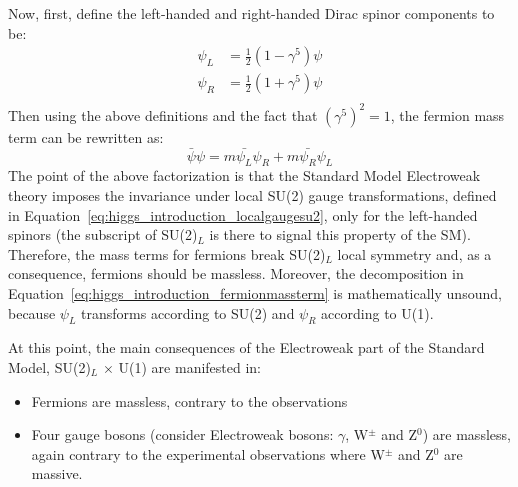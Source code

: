 Now, first, define the left-handed and right-handed Dirac spinor components to be:
\begin{subequations}\label{eq:higgs_introduction_chiralprojections}
\begin{align}
    \psi_L& = \frac{1}{2}(1 - \gamma^{5})\psi\\
    \psi_R& = \frac{1}{2}(1 + \gamma^{5})\psi\\
\end{align}
\end{subequations}
Then using the above definitions and the fact that $(\gamma^5)^2 = 1$, the fermion mass term can be rewritten as:
\begin{equation}\label{eq:higgs_introduction_fermionmassterm}
    \bar{\psi}\psi = m \bar{\psi_L}\psi_R + m \bar{\psi_R}\psi_L
\end{equation}
The point of the above factorization is that the Standard Model Electroweak theory imposes the invariance under local SU(2) gauge transformations, defined in Equation~\ref{eq:higgs_introduction_localgaugesu2}, only for the left-handed spinors (the subscript of SU(2)$_L$ is there to signal this property of the SM). Therefore, the mass terms for fermions break SU(2)$_L$ local symmetry and, as a consequence, fermions should be massless. Moreover, the decomposition in Equation~\ref{eq:higgs_introduction_fermionmassterm} is mathematically unsound, because $\psi_L$ transforms according to SU(2) and $\psi_R$ according to U(1).

At this point, the main consequences of the Electroweak part of the Standard Model, SU(2)$_L$ $\times$ U(1) are manifested in:
\begin{itemize}
    \item Fermions are massless, contrary to the observations
    \item Four gauge bosons (consider Electroweak bosons: $\gamma$, W$^{\pm}$ and Z$^0$) are massless, again contrary to the experimental observations where W$^{\pm}$ and Z$^0$ are massive.
\end{itemize}

